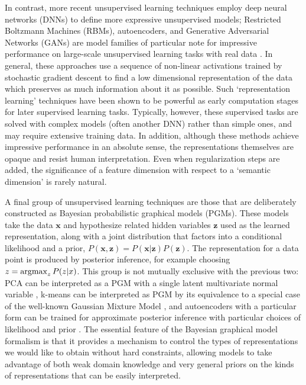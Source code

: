 In contrast, more recent unsupervised learning techniques employ deep neural networks (DNNs) to define more expressive unsupervised models; Restricted Boltzmann Machines (RBMs), autoencoders, and Generative Adversarial Networks (GANs) are model families of particular note for impressive performance on large-scale unsupervised learning tasks with real data \citep{Bengio2013,Goodfellow2014}.  In general, these approaches use a sequence of non-linear activations trained by stochastic gradient descent to find a low dimensional representation of the data which preserves as much information about it as possible. Such `representation learning' techniques have been shown to be powerful as early computation stages for later supervised learning tasks. Typically, however, these supervised tasks are solved with complex models (often another DNN) rather than simple ones, and may require extensive training data. In addition, although these methods achieve impressive performance in an absolute sense, the representations themselves are opaque and resist human interpretation. Even when regularization steps are added, the significance of a feature dimension with respect to a `semantic dimension' is rarely natural.

A final group of unsupervised learning techniques are those that are deliberately constructed as Bayesian probabilistic graphical models (PGMs). These models take the data $\textbf{x}$ and hypothesize related hidden variables $\textbf{z}$ used as the learned representation, along with a joint distribution that factors into a conditional likelihood and a prior, $P(\textbf{x}, \textbf{z}) = P(\textbf{x}|\textbf{z}) P(\textbf{z})$. The representation for a data point is produced by posterior inference, for example choosing $z = \operatorname*{argmax}_z P(z | x)$. This group is not mutually exclusive with the previous two: PCA can be interpreted as a PGM with a single latent multivariate normal variable \citep{Bishop1999}, k-means can be interpreted as PGM by its equivalence to a special case of the well-known Gaussian Mixture Model  \citep{BishopCh9}, and autoencoders with a particular form can be trained for approximate posterior inference with particular choices of likelihood and prior \citep{Kingma2014}. The essential feature of the Bayesian graphical model formalism is that it provides a mechanism to control the types of representations we would like to obtain without hard constraints, allowing models to take advantage of both weak domain knowledge and very general priors on the kinds of representations that can be easily interpreted.

